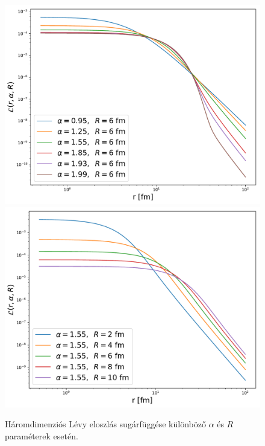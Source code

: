 \documentclass[10pt,a4paper]{article}
\numberwithin{equation}{subsection}
\numberwithin{figure}{section}
\begin{document}
\begin{figure}[H]
\centering
\includegraphics[scale=0.35]{pic/BEintro/Levy_alpha.pdf}
\includegraphics[scale=0.35]{pic/BEintro/Levy_R.pdf}
\caption{Háromdimenziós Lévy eloszlás sugárfüggése különböző $\alpha$ és $R$ paraméterek esetén.}
\label{fig:Levy}
\end{figure}
\end{document}
